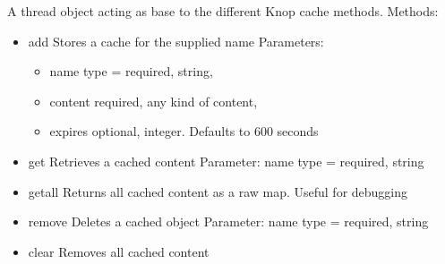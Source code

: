 \documentclass[letterpaper,10pt,english]{sphinxmanual}
\begin{document}
\begin{fulllineitems}
\label{knop_cache:knop_cache}
A thread object acting as base to the different Knop cache methods.
Methods:
\begin{itemize}
\item {} 
add
Stores a cache for the supplied name
Parameters:
\begin{itemize}
\item {} 
name type = required, string,

\item {} 
content required, any kind of content,

\item {} 
expires optional, integer. Defaults to 600 seconds

\end{itemize}

\item {} 
get
Retrieves a cached content
Parameter: name type = required, string

\item {} 
getall
Returns all cached content as a raw map. Useful for debugging

\item {} 
remove
Deletes a cached object
Parameter: name type = required, string

\item {} 
clear
Removes all cached content

\end{itemize}

\begin{fulllineitems}
\label{knop_cache:knop_cache.active_tick}
\end{fulllineitems}


\begin{fulllineitems}
\label{knop_cache:knop_cache.add}
\end{fulllineitems}


\begin{fulllineitems}
\label{knop_cache:knop_cache.caches}
\end{fulllineitems}




\end{fulllineitems}
\end{document}
